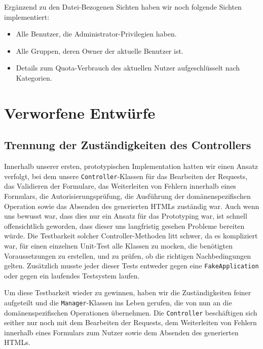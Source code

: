 \documentclass[12pt,DIV14,BCOR10mm,a4paper,parskip=half-,headsepline,headinclude,english,ngerman,bibliography=totocnumbered]{scrreprt}
\begin{document}
Ergänzend zu den Datei-Bezogenen Sichten haben wir noch folgende Sichten implementiert:

\begin{itemize}
	\item Alle Benutzer, die Administrator-Privilegien haben.
	\item Alle Gruppen, deren Owner der aktuelle Benutzer ist.
	\item Details zum Quota-Verbrauch des aktuellen Nutzer aufgeschlüsselt nach Kategorien.
\end{itemize}


\chapter{Verworfene Entwürfe}

\section{Trennung der Zuständigkeiten des Controllers}

Innerhalb unserer ersten, prototypischen Implementation hatten wir einen Ansatz verfolgt, bei dem unsere \texttt{Controller}-Klassen für das Bearbeiten der Requests, das Validieren der Formulare, das Weiterleiten von Fehlern innerhalb eines Formulars, die Autorisierungsprüfung, die Ausführung der domänenspezifischen Operation sowie das Absenden des generierten HTMLs zuständig war.
Auch wenn uns bewusst war, dass dies nur ein Ansatz für das Prototyping war, ist schnell offensichtlich geworden, dass dieser uns langfristig gesehen Probleme bereiten würde.
Die Testbarkeit solcher Controller-Methoden litt schwer, da es kompliziert war, für einen einzelnen Unit-Test alle Klassen zu mocken, die benötigten Voraussetzungen zu erstellen, und zu prüfen, ob die richtigen Nachbedingungen gelten.
Zusätzlich musste jeder dieser Tests entweder gegen eine \texttt{FakeApplication} oder gegen ein laufendes Testsystem laufen.

Um diese Testbarkeit wieder zu gewinnen, haben wir die Zuständigkeiten feiner aufgeteilt und die \texttt{Manager}-Klassen ins Leben gerufen, die von nun an die domänenspezifischen Operationen übernehmen.
Die \texttt{Controller} beschäftigen sich seither nur noch mit dem Bearbeiten der Requests, dem Weiterleiten von Fehlern innerhalb eines Formulars zum Nutzer sowie dem Absenden des generierten HTMLs.
\end{document}
